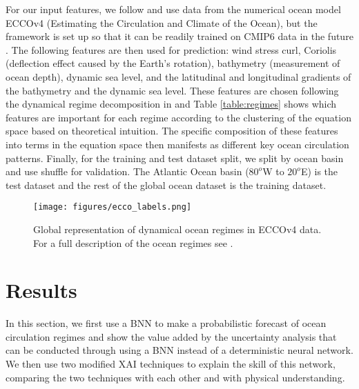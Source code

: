 \documentclass[a4paper]{article}
\begin{document}
 For our input features, we follow \cite{THOR} and use data from the numerical ocean model ECCOv4 (Estimating the Circulation and Climate of the Ocean), but the framework is set up so that it can be readily trained on CMIP6 data in the future \citep{forget2015ecco}. The following features are then used for prediction: wind stress curl, Coriolis (deflection effect caused by the Earth's rotation), bathymetry (measurement of ocean depth), dynamic sea level, and the latitudinal and longitudinal gradients of the bathymetry and the dynamic sea level. These features are chosen following the dynamical regime decomposition in \cite{sonnewald2019unsupervised} and Table \ref{table:regimes} shows which features are important for each regime according to the clustering of the equation space based on theoretical intuition. The specific composition of these features into terms in the equation space then manifests as different key ocean circulation patterns. Finally, for the training and test dataset split, we split by ocean basin and use shuffle for validation. The Atlantic Ocean basin ($80^{o}$W to $20^{o}$E) is the test dataset and the rest of the global ocean dataset is the training dataset.

\begin{figure}
    \centering
    \texttt{[image: figures/ecco\_labels.png]}
    \caption{Global representation of dynamical ocean regimes in ECCOv4 data. For a full description of the ocean regimes see \cite{THOR}.}
    \label{fig:ecco_labels}
\end{figure}

\section{Results}\label{sec:results}
In this section, we first use a BNN to make a probabilistic forecast of ocean circulation regimes and show the value added by the uncertainty analysis that can be conducted through using a BNN instead of a deterministic neural network. We then use two modified XAI techniques to explain the skill of this network, comparing the two techniques with each other and with physical understanding.
\end{document}

